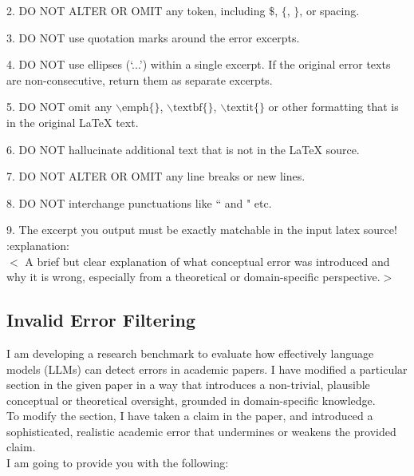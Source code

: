 \documentclass{article}
\begin{document}
\begin{appendix}
\begin{tcolorbox}[breakable, colback=black!5!white,colframe=black!20!white,title=\textbf{\textcolor{black}{Error Generation Prompt}}]
    2. DO NOT ALTER OR OMIT any token, including $\$$, $\{$, $\}$, or spacing.
    
    3. DO NOT use quotation marks around the error excerpts.
    
    4. DO NOT use ellipses (`...') within a single excerpt. If the original error texts are non-consecutive, return them as separate excerpts.
    
    5. DO NOT omit any $\backslash \text{emph}\{\}$, $\backslash \text{textbf}\{\}$, $\backslash \text{textit}\{\}$ or other formatting that is in the original LaTeX text. 
    
    6. DO NOT hallucinate additional text that is not in the LaTeX source. 
    
    7. DO NOT ALTER OR OMIT any line breaks or new lines.
    
    8. DO NOT interchange punctuations like `` and " etc.
    
    9. The excerpt you output must be exactly matchable in the input latex source!\\
    
    :explanation:\\
    $<$ A brief but clear explanation of what conceptual error was introduced and why it is wrong, especially from a theoretical or domain-specific perspective.$>$
\end{tcolorbox}

\subsection{Invalid Error Filtering}
\begin{tcolorbox}[breakable, colback=black!5!white,colframe=black!20!white,title=\textbf{\textcolor{black}{Invalid Error Filtering Prompt}}]\label{appendix:invalid_error_filter}
\small
    I am developing a research benchmark to evaluate how effectively language models (LLMs) can detect errors in academic papers. I have modified a particular section in the given paper in a way that introduces a non-trivial, plausible conceptual or theoretical oversight, grounded in domain-specific knowledge.\\

    To modify the section, I have taken a claim in the paper, and introduced a sophisticated, realistic academic error that undermines or weakens the provided claim. \\
    
    I am going to provide you with the following:\\
    

\end{tcolorbox}
\end{appendix}
\end{document}
